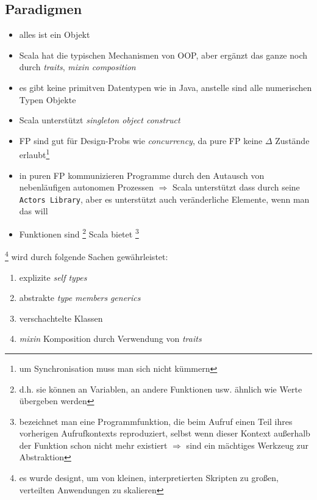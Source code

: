\begin{itemize}
\end{itemize}
  

\subsection{Paradigmen}


\begin{itemize}
  \item alles ist ein Objekt
  \item Scala hat die typischen Mechanismen von OOP, aber ergänzt das ganze
  noch durch \textit{traits}, \textit{mixin composition}
  \item es gibt keine primitven Datentypen wie in Java, anstelle sind alle 
  numerischen Typen Objekte
  \item Scala unterstützt \textit{singleton object construct}
\end{itemize}




\begin{itemize}
  \item FP sind gut für Design-Probs wie \textit{concurrency}, da pure FP
  keine $\Delta$ Zustände erlaubt\footnote{um Synchronisation muss man
  sich nicht kümmern}
  \item in puren FP kommunizieren Programme durch den Autausch von
  nebenläufigen autonomen Prozessen $\Rightarrow$ Scala unterstützt dass
  durch seine \texttt{Actors Library}, aber es unterstützt auch
  veränderliche Elemente, wenn man das will
  \item Funktionen sind \footnote{d.h. sie können 
  an Variablen, an andere Funktionen usw. ähnlich wie Werte übergeben werden}
  \und Scala bietet \footnote{bezeichnet man 
  eine Programmfunktion, die beim Aufruf einen Teil ihres vorherigen
  Aufrufkontexts reproduziert, selbst wenn dieser Kontext außerhalb der 
  Funktion schon nicht mehr existiert $\Rightarrow$ sind ein mächtiges 
  Werkzeug zur Abstraktion} 
\end{itemize}


\footnote{es wurde designt, um von kleinen, interpretierten
Skripten zu großen, verteilten Anwendungen zu skalieren} wird durch folgende
Sachen gewährleistet:


\begin{enumerate}
  \item explizite \textit{self types}
  \item abstrakte \textit{type members} \und \textit{generics}
  \item verschachtelte Klassen
  \item \textit{mixin} Komposition durch Verwendung von \textit{traits}
\end{enumerate}


